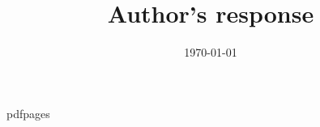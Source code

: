 \marginsize{2cm}{2cm}{0cm}{1cm} %
\renewcommand\familydefault{\sfdefault}


 \renewcommand{\topfraction}{.9}	%
 \renewcommand{\bottomfraction}{.9}	%
 \renewcommand{\textfraction}{0.1}	%

 
\newenvironment{ig}[1]{
\begin{center}
 \texttt{[image: \#1]} 
\end{center}}

\usepackage{pdfpages}

\newlength\tindent
\setlength{\tindent}{\parindent}
\setlength{\parindent}{0pt}
\renewcommand{\indent}{\hspace*{\tindent}}

 
\date{{}\today}
\title{Author's response} %

\author{}


\maketitle

\tableofcontents




